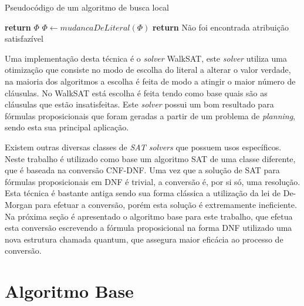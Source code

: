 \documentclass{ufsc-thesis}
\begin{document}
\begin{algorithm}
\caption{Pseudocódigo de um algoritmo de busca local} \label{alg:local}
\begin{algorithmic}[1]
     
            \State \textbf{return} $\Phi$
        \EndIf
        \State $\Phi \gets mudancaDeLiteral(\Phi)$ 
    \EndFor
\EndFor
\State \textbf{return} Não foi encontrada atribuição satisfazível
\EndProcedure
\end{algorithmic}
\end{algorithm}

Uma implementação desta técnica é o \textit{solver} WalkSAT\cite{Selman95}, 
este \textit{solver} utiliza uma otimização que consiste no modo de escolha 
do literal a alterar o valor verdade, na maioria dos algoritmos 
a escolha é feita de modo a atingir o maior número de cláusulas. No 
WalkSAT está escolha é feita tendo como base quais são as cláusulas que 
estão insatisfeitas. Este \textit{solver} possui um bom resultado 
para fórmulas proposicionais que foram geradas a partir de um problema 
de \textit{planning}, sendo esta sua principal aplicação\cite{Kautz1996}.

Existem outras diversas classes de \textit{SAT solvers} que possuem 
usos específicos. Neste trabalho é utilizado como base um algoritmo 
SAT de uma classe diferente, que é baseada na conversão CNF-DNF. 
Uma vez que a solução de SAT para fórmulas proposicionais em DNF é 
trivial, a conversão é, por si só, uma resolução. Esta técnica é bastante 
antiga sendo sua forma clássica a utilização da lei de De-Morgan para efetuar 
a conversão\cite{Skiena2008}, porém esta solução é extremamente ineficiente\cite{Miltersen2005}. 
Na próxima seção é apresentado o algoritmo base para este trabalho, que 
efetua esta conversão escrevendo a fórmula proposicional na forma DNF 
utilizado uma nova estrutura chamada quantum, que assegura maior eficácia 
ao processo de conversão.

\section{Algoritmo Base}
\label{sec:algbase}

\end{document}
